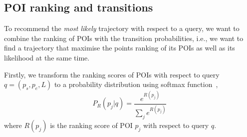 \subsection{POI ranking and transitions}
\label{sec:rank+markov}



To recommend the \textit{most likely} trajectory with respect to a query,
we want to combine the ranking of POIs with the transition probabilities,
i.e., we want to find a trajectory that maximise the points ranking of its POIs
as well as its likelihood at the same time.

Firstly, we transform the ranking scores of POIs with respect to query $q = (p_s, p_e, L)$
to a probability distribution using softmax function~\cite{bishop2006},
\begin{equation}
  \label{eq:poi-probability}
  P_R(p_j | q) = \frac{e^{R(p_j)}}{\sum_j e^{R(p_j)}}
\end{equation}
where $R(p_j)$ is the ranking score of POI $p_j$ with respect to query $q$.


